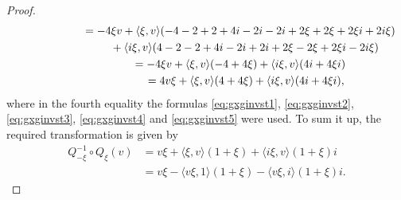 \documentclass[10pt,a4paper]{amsart}
\numberwithin{equation}{section}
\begin{document}
\begin{proof}
\begin{gather*}
\hphantom{4 Q_{-\xi}^{-1}\circ Q_\xi(v)}{} =-4\xi v+ \langle \xi,v\rangle (-4-2+2+4i-2i-2i+2\xi+2\xi+2\xi i+2i\xi)\\
\hphantom{4 Q_{-\xi}^{-1}\circ Q_\xi(v) =}{} +\langle i\xi,v\rangle(4-2-2+4i-2i+2i+2\xi-2\xi+2\xi i-2 i\xi)\\
\hphantom{4 Q_{-\xi}^{-1}\circ Q_\xi(v)}{} = -4\xi v+ \langle \xi,v\rangle(-4+4\xi)+ \langle i \xi,v\rangle(4i+4\xi i)\\
\hphantom{4 Q_{-\xi}^{-1}\circ Q_\xi(v) =}{} = 4v \xi+ \langle \xi,v\rangle(4+4\xi)+ \langle i \xi,v\rangle(4i+4\xi i),
\end{gather*}
 where in the fourth equality the formulas \eqref{eq:gxginvst1}, \eqref{eq:gxginvst2}, \eqref{eq:gxginvst3}, \eqref{eq:gxginvst4} and \eqref{eq:gxginvst5} were used.
 To sum it up, the required transformation is given by
\begin{align*}
 Q_{-\xi}^{-1}\circ Q_\xi(v)&= v \xi+ \langle \xi,v\rangle(1+\xi)+ \langle i \xi,v\rangle(1+\xi)i\\
 &=v \xi- \langle v \xi,1\rangle(1+\xi)- \langle v\xi ,i\rangle(1+\xi)i.\tag*{\qed}
 \end{align*}\renewcommand{\qed}{}
\end{proof}
\end{document}
